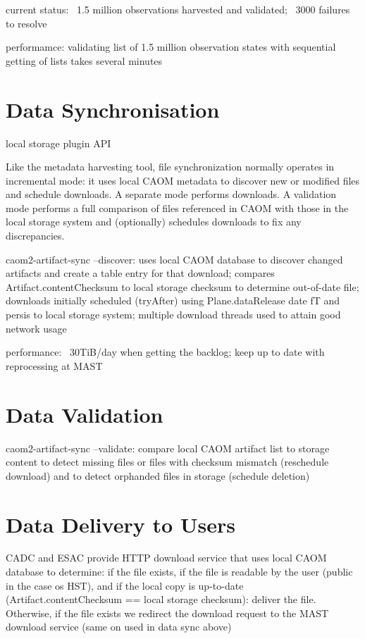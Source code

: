 \documentclass[11pt,twoside]{article}
\begin{document}
current status: ~1.5 million observations harvested and validated; ~3000 failures to resolve

performamce: validating list of 1.5 million observation states with sequential getting of lists takes several minutes

\section{Data Synchronisation}

local storage plugin API

Like the metadata harvesting tool, file synchronization normally operates in incremental mode: it uses local CAOM metadata to discover new or modified files and schedule downloads. A separate mode performs downloads. A validation mode performs a full comparison of files referenced in CAOM with those in the local storage system and (optionally) schedules downloads to fix any discrepancies.

caom2-artifact-sync --discover: uses local CAOM database to discover changed artifacts and create a table entry for that download; compares Artifact.contentChecksum to local storage checksum to determine out-of-date file; downloads initially scheduled (tryAfter) using Plane.dataRelease date
fT and persis to local storage system; multiple download threads used to attain good network usage

performance: ~30TiB/day when getting the backlog; keep up to date with reprocessing at MAST

\section{Data Validation}

caom2-artifact-sync --validate: compare local CAOM artifact list to storage content to detect missing files or files with checksum mismatch (reschedule download) and to detect orphanded files in storage (schedule deletion)

\section{Data Delivery to Users}

CADC and ESAC provide HTTP download service that uses local CAOM database to determine: if the file exists, if the file is readable by the user (public in the case os HST), and if the local copy is up-to-date (Artifact.contentChecksum == local storage checksum): deliver the file. Otherwise, if the file exists we redirect the download request to the MAST download service (same on used in data sync above)
\end{document}
